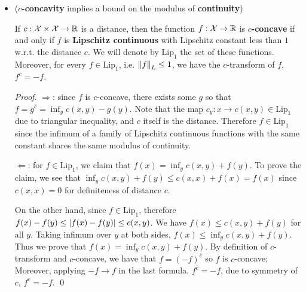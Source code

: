 \documentclass[11pt]{article}
\begin{document}
\begin{itemize}
This proof generalize to aribitrary function $f$ and its c-transform $f^{c}$ for all $x$ and $y$
\begin{proposition} 
Suppose that $c: \cX \times \cY \rightarrow \bR_{+}$ is real valued. 
\begin{enumerate}
\item For any $f_1: \cX \rightarrow \bR$ and $f_2: \cX \rightarrow \bR$, $f_{1} \le f_{2},\Leftrightarrow\;    f_{1}^{c} \ge f_{2}^{c}$
\item For any $f: \cX \rightarrow \bR$ and $g: \cY \rightarrow \bR$, $f^{c\bar{c}} \ge f, \;  g^{\bar{c}c} \ge g$ In general, $f^{c\bar{c}}$ is the \textbf{smallest $c$-concave function} larger than $f$
\item $f^{c\bar{c}c} =  f^{c}$ and $g^{\bar{c}c\bar{c}} =  g^{\bar{c}}$; in other words, $f^{c\bar{c}} = f$ if and only if $f$ is a $c$-concave function
\end{enumerate}
\end{proposition}



\item (\textbf{$c$-concavity} implies  a bound on the modulus of \textbf{continuity})
 \begin{proposition}\label{prop: c_concavity_lipschitz}
If $c: {\mathcal X} \times {\mathcal X}\rightarrow {\mathbb R}$ is a distance, then the function $f: \cX \rightarrow \bR$ is \textbf{$c$-concave} if and only if $f$ is \textbf{Lipschitz continuous} with Lipschitz constant less than $1$ w.r.t. the distance $c$.  We will denote by $\text{Lip}_1$ the set of these functions. Moreover, for every $f \in \text{Lip}_1$, i.e. $\left\|f\right\|_{L} \le 1$, we have the $c$-transform of $f$, $f^{c} = -f$. \citep{santambrogio2015optimal}
\end{proposition}
\begin{proof}
$\Rightarrow$: since $f$ is $c$-concave, there exists some $g$ so that $f = g^{\bar{c}} = \inf_{y}c(x,y) - g(y)$. Note that the map $c_{y}: x\rightarrow c(x,y) \in \text{Lip}_1$  due to triangular inequality, and $c$ itself is the distance. Therefore $f \in \text{Lip}_1$ since the infimum of a family of Lipschitz continuous functions with the same
constant shares the same modulus of continuity. 

$\Leftarrow$: for $f \in  \text{Lip}_1$, we claim that $f(x) = \inf_{y}c(x,y) + f(y)$. To prove the claim, we see that $ \inf_{y}c(x,y) + f(y) \le  c(x,x) + f(x) = f(x)$ since $c(x,x) = 0$ for definiteness of distance $c$.

On the other hand, since  $f \in \text{Lip}_1$, therefore $f(x) -  f(y) \le \left\lvert f(x) -  f(y)  \right\rvert \le c(x, y)$. We have $f(x) \le c(x, y) + f(y)$ for all $y$. Taking infimum over $y$ at both sides, $f(x) \le \inf_{y}c(x, y) + f(y)$. Thus we prove that $f(x) = \inf_{y}c(x,y) + f(y)$. By definition of $c$-transform and $c$-concave, we have that $f = (-f)^{\bar{c}}$ so $f$ is  $c$-concave; Moreover, applying $-f \rightarrow f$ in the last formula, $f^{\bar{c}}=-f$, due to symmetry of $c$, $f^{c}=-f.$ \qed
\end{proof}
\end{itemize}
\end{document}
